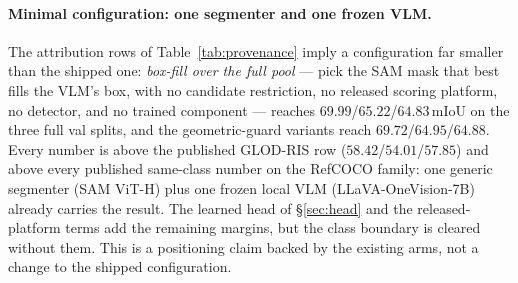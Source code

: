 \paragraph{Minimal configuration: one segmenter and one frozen VLM.}
The attribution rows of Table~\ref{tab:provenance} imply a configuration far
smaller than the shipped one: \emph{box-fill over the full pool} --- pick the
SAM mask that best fills the VLM's box, with no candidate restriction, no
released scoring platform, no detector, and no trained component --- reaches
$69.99$/$65.22$/$64.83$\,mIoU on the three full val splits, and the
geometric-guard variants reach $69.72$/$64.95$/$64.88$. Every number is above
the published GLOD-RIS row ($58.42$/$54.01$/$57.85$) and above every
published same-class number on the RefCOCO family: one generic segmenter
(SAM ViT-H) plus one frozen local VLM (LLaVA-OneVision-7B) already carries
the result. The learned head of \S\ref{sec:head} and the released-platform
terms add the remaining margins, but the class boundary is cleared without
them. This is a positioning claim backed by the existing arms, not a change
to the shipped configuration.

